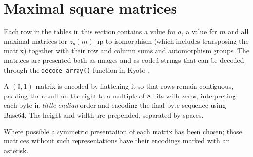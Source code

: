 \documentclass[10pt,a4paper]{article}
\theoremstyle{definition}
\begin{document}
	\section{Maximal square matrices}
	
	Each row in the tables in this section contains a value for $a$, a value for $m$ and all maximal matrices for $z_a(m)$ up to isomorphism (which includes transposing the matrix) together with their row and column sums and automorphism groups. The matrices are presented both as images and as coded strings that can be decoded through the \texttt{decode\_array()} function in Kyoto \cite{kyoto}.
	
	A $(0,1)$-matrix is encoded by flattening it so that rows remain contiguous, padding the result on the right to a multiple of 8 bits with zeros, interpreting each byte in \textit{little-endian} order and encoding the final byte sequence using Base64. The height and width are prepended, separated by spaces.
	
	Where possible a symmetric presentation of each matrix has been chosen; those matrices without such representations have their encodings marked with an asterisk.
	
\end{document}
